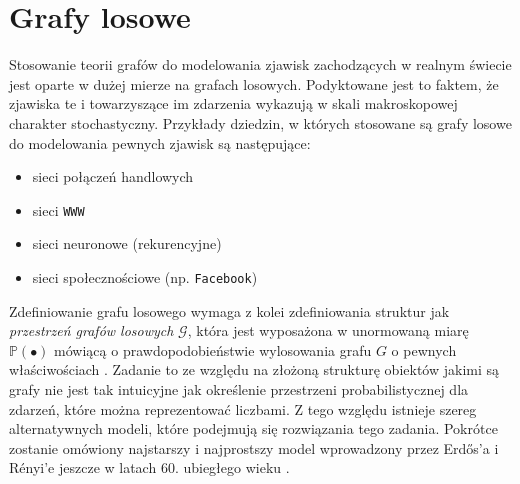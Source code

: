 \documentclass{article}
\begin{document}
\section{Grafy losowe \label{s3}}
	Stosowanie teorii grafów do modelowania zjawisk zachodzących w realnym świecie jest oparte w dużej mierze na grafach losowych. Podyktowane 
	jest to faktem, że zjawiska te i towarzyszące im zdarzenia wykazują w skali makroskopowej charakter stochastyczny. Przykłady dziedzin, w których stosowane
	są grafy losowe do modelowania pewnych zjawisk są następujące:
		\begin{itemize}
			\item 	sieci połączeń handlowych
			\item	sieci \texttt{WWW}
			\item	sieci neuronowe (rekurencyjne)
			\item	sieci społecznościowe (np. \texttt{Facebook})
		\end{itemize}
	Zdefiniowanie grafu losowego wymaga z kolei zdefiniowania struktur jak \textit{przestrzeń grafów losowych} $\mathcal{G}$, która jest
	wyposażona w unormowaną miarę $\mathbb{P}(\bullet)$ mówiącą o prawdopodobieństwie wylosowania grafu $G$ o pewnych właściwościach \cite{Fronczak1}.
	\newline
	Zadanie to ze względu na złożoną strukturę obiektów jakimi są grafy nie jest tak intuicyjne jak określenie przestrzeni probabilistycznej dla
	zdarzeń, które można reprezentować liczbami. Z tego względu istnieje szereg alternatywnych modeli, które podejmują się rozwiązania tego zadania.
	Pokrótce zostanie omówiony najstarszy i najprostszy model wprowadzony przez Erdős'a i Rényi'e jeszcze w latach 60. ubiegłego wieku \cite{Erdos1}. 
\end{document}
